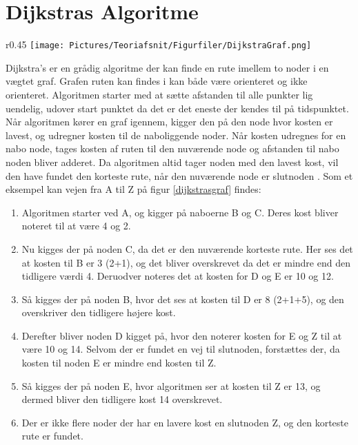\section{Dijkstras Algoritme}\label{DijkstraTeori}
\begin{wrapfigure}{r}{0.45\textwidth}
    \centering
  \texttt{[image: Pictures/Teoriafsnit/Figurfiler/DijkstraGraf.png]}
  \label{dijkstrasgraf}
  \caption{En vægtet ikke-orienteret graf}
\end{wrapfigure}

Dijkstra's er en grådig algoritme der kan finde en rute imellem to noder i en vægtet graf. Grafen ruten kan findes i kan både være orienteret og ikke orienteret. Algoritmen starter med at sætte afstanden til alle punkter lig uendelig, udover start punktet da det er det eneste der kendes til på tidspunktet. Når algoritmen kører en graf igennem, kigger den på den node hvor kosten er lavest, og udregner kosten til de naboliggende noder. Når kosten udregnes for en nabo node, tages kosten af ruten til den nuværende node og afstanden til nabo noden bliver adderet. Da algoritmen altid tager noden med den lavest kost, vil den have fundet den korteste rute, når den nuværende node er slutnoden \cite[s. 681-684]{DMATBOGEN}. Som et eksempel kan vejen fra A til Z på figur \ref{dijkstrasgraf} findes:

\begin{enumerate}
\item Algoritmen starter ved A, og kigger på naboerne B og C. Deres kost bliver noteret til at være 4 og 2.
\item Nu kigges der på noden C, da det er den nuværende korteste rute. Her ses det at kosten til B er 3 (2+1), og det bliver overskrevet da det er mindre end den tidligere værdi 4. Deruodver noteres det at kosten for D og E er 10 og 12.
\item Så kigges der på noden B, hvor det ses at kosten til D er 8 (2+1+5), og den overskriver den tidligere højere kost.
\item Derefter bliver noden D kigget på, hvor den noterer kosten for E og Z til at være 10 og 14. Selvom der er fundet en vej til slutnoden, forstættes der, da kosten til noden E er mindre end kosten til Z.
\item Så kigges der på noden E, hvor algoritmen ser at kosten til Z er 13, og dermed bliver den tidligere kost 14 overskrevet.
\item Der er ikke flere noder der har en lavere kost en slutnoden Z, og den korteste rute er fundet.
\end{enumerate}

